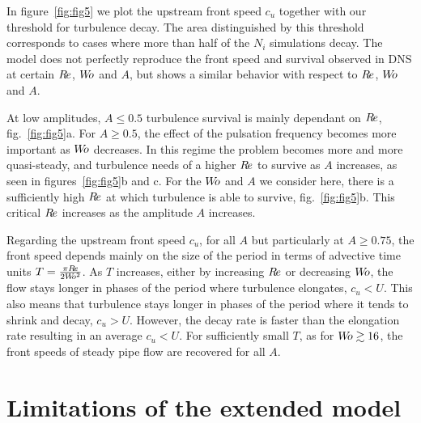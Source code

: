 \documentclass{article}
\DeclareRobustCommand{\Reynolds}{\ensuremath{R\hspace{-0.1em}e}\xspace}     %
\DeclareRobustCommand{\Womersley}{\ensuremath{W\hspace{-0.25em}o}\xspace}    %
\DeclareRobustCommand{\Amplitude}{\ensuremath{A}\xspace}    %
\begin{document}
In figure~\ref{fig:fig5} we plot the upstream front speed $c_{u}$ together with our threshold for turbulence decay. The area distinguished by this threshold corresponds to cases where more than half of the $N_{i}$ simulations decay. The model does not perfectly reproduce the front speed and survival observed in DNS at certain \Reynolds, \Womersley and \Amplitude, but shows a similar behavior with respect to \Reynolds, \Womersley and \Amplitude.

At low amplitudes, $\Amplitude\leq0.5$ turbulence survival is mainly dependant on $\Reynolds$, fig.~\ref{fig:fig5}a. For $\Amplitude \geq 0.5$, the effect of the pulsation frequency becomes more important as $\Womersley$ decreases. In this regime the problem becomes more and more quasi-steady, and turbulence needs of a higher \Reynolds to survive as \Amplitude increases, as seen in figures~\ref{fig:fig5}b and c. For the \Womersley and \Amplitude we consider here, there is a sufficiently high \Reynolds at which turbulence is able to survive, fig.~\ref{fig:fig5}b. This critical \Reynolds increases as the amplitude \Amplitude increases.

Regarding the upstream front speed $c_{u}$, for all $\Amplitude$ but particularly at $\Amplitude \geq 0.75$, the front speed depends mainly on the size of the period in terms of advective time units $T=\frac{\pi \Reynolds}{2 \Womersley^{2}}$. As $T$ increases, either by increasing \Reynolds or decreasing \Womersley, the flow stays longer in phases of the period where turbulence elongates, $c_{u}<U$. This also means that turbulence stays longer in phases of the period where it tends to shrink and decay, $c_{u}>U$. However, the decay rate is faster than the elongation rate resulting in an average $c_{u}<U$. For sufficiently small $T$, as for $\Womersley \gtrsim 16$, the front speeds of steady pipe flow are recovered for all \Amplitude.




\section{Limitations of the extended model}










\end{document}
